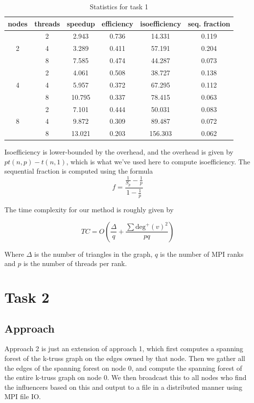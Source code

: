 \documentclass[12pt]{article}
\begin{document}
\begin{table}[!htbp]
    \centering
\begin{tabular}{|c|c|c|c|c|c|}
    \hline
    nodes & threads & speedup & efficiency & isoefficiency & seq. fraction\\

    \hline
    \multirow{3}{*}{2}
    & 2 & 2.943 & 0.736 & 14.331 & 0.119 \\
    & 4 & 3.289 & 0.411 & 57.191 & 0.204 \\
    & 8 & 7.585 & 0.474 & 44.287 & 0.073 \\

    \hline
    \multirow{3}{*}{4}
    & 2 & 4.061 & 0.508 & 38.727 & 0.138 \\
    & 4 & 5.957 & 0.372 & 67.295 & 0.112 \\
    & 8 & 10.795 & 0.337 & 78.415 & 0.063 \\

    \hline
    \multirow{3}{*}{8}
    & 2 & 7.101 & 0.444 & 50.031 & 0.083 \\
    & 4 & 9.872 & 0.309 & 89.487 & 0.072 \\
    & 8 & 13.021 & 0.203 & 156.303 & 0.062 \\
    \hline
\end{tabular}
\caption{Statistics for task 1}
\end{table}

Isoefficiency is lower-bounded by the overhead, and the overhead is given 
by $pt(n,p) - t(n,1)$, which is what we've used here to compute isoefficiency.
The sequential fraction is computed using the formula 
$$f = \frac{\frac{1}{S_p} - \frac{1}{p}}{1 - \frac 1p}$$

The time complexity for our method is roughly given by

$$TC = O\left(\frac{\Delta}{q} + \frac{\sum \text{deg}^+(v)^2}{pq}\right)$$

Where $\Delta$ is the number of triangles in the graph, $q$ is the number of MPI
ranks and $p$ is the number of threads per rank.

\section*{Task 2}

\subsection*{Approach}

Approach 2 is just an extension of approach 1, which first computes a spanning
forest of the k-truss graph on the edges owned by that node. Then we gather all
the edges of the spanning forest on node 0, and compute the spanning forest of 
the entire k-truss graph on node 0. We then broadcast this to all nodes who 
find the influencers based on this and output to a file in a distributed manner
using MPI file IO.
\end{document}
